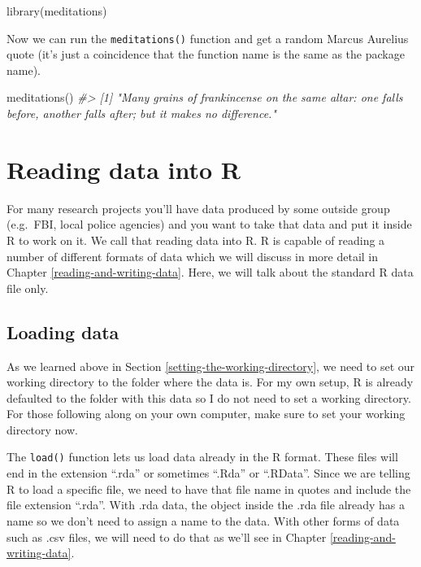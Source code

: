 \documentclass[
]{krantz}
\makeatletter
\newenvironment{Shaded}{\begin{snugshade}}{\end{snugshade}}
\newcommand{\CommentTok}[1]{\textcolor[rgb]{0.37,0.37,0.37}{\textit{#1}}}
\newcommand{\FunctionTok}[1]{\textcolor[rgb]{0,0,0}{#1}}
\newcommand{\NormalTok}[1]{#1}
\newenvironment{kframe}{%
\medskip{}
\setlength{\fboxsep}{.8em}
 \def\at@end@of@kframe{}%
 \ifinner\ifhmode%
  \def\at@end@of@kframe{\end{minipage}}%
  \begin{minipage}{\columnwidth}%
 \fi\fi%
 \def\FrameCommand##1{\hskip\@totalleftmargin \hskip-\fboxsep
 \colorbox{shadecolor}{##1}\hskip-\fboxsep
     \hskip-\linewidth \hskip-\@totalleftmargin \hskip\columnwidth}%
 \MakeFramed {\advance\hsize-\width
   \@totalleftmargin\z@ \linewidth\hsize
   \@setminipage}}%
 {\par\unskip\endMakeFramed%
 \at@end@of@kframe}
\renewenvironment{Shaded}{\begin{kframe}}{\end{kframe}}
\makeatother
\begin{document}
\begin{Shaded}
\begin{Highlighting}[]
\FunctionTok{library}\NormalTok{(meditations)}
\end{Highlighting}
\end{Shaded}

Now we can run the \texttt{meditations()} function and get a random Marcus Aurelius quote (it's just a coincidence that the function name is the same as the package name).

\begin{Shaded}
\begin{Highlighting}[]
\FunctionTok{meditations}\NormalTok{()}
\CommentTok{\#\textgreater{} [1] "Many grains of frankincense on the same altar: one falls before, another falls after; but it makes no difference."}
\end{Highlighting}
\end{Shaded}

\hypertarget{reading-data-into-r}{%
\section{Reading data into R}\label{reading-data-into-r}}

For many research projects you'll have data produced by some outside group (e.g.~FBI, local police agencies) and you want to take that data and put it inside R to work on it. We call that reading data into R. R is capable of reading a number of different formats of data which we will discuss in more detail in Chapter \ref{reading-and-writing-data}. Here, we will talk about the standard R data file only.

\hypertarget{loading-data-intro}{%
\subsection{Loading data}\label{loading-data-intro}}

As we learned above in Section \ref{setting-the-working-directory}, we need to set our working directory to the folder where the data is. For my own setup, R is already defaulted to the folder with this data so I do not need to set a working directory. For those following along on your own computer, make sure to set your working directory now.

The \texttt{load()} function lets us load data already in the R format. These files will end in the extension ``.rda'' or sometimes ``.Rda'' or ``.RData''. Since we are telling R to load a specific file, we need to have that file name in quotes and include the file extension ``.rda''. With .rda data, the object inside the .rda file already has a name so we don't need to assign a name to the data. With other forms of data such as .csv files, we will need to do that as we'll see in Chapter \ref{reading-and-writing-data}.
\end{document}

